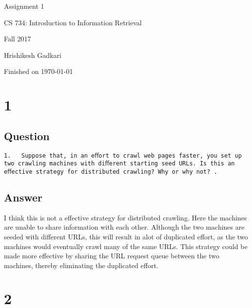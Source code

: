 \documentclass[letterpaper,11pt]{article}
\begin{document}
\begin{titlepage}

\begin{center}

\Huge{Assignment 1}

\Large{CS 734:  Introduction to Information Retrieval}

\Large{Fall 2017}

\Large{Hrishikesh Gadkari}

\Large Finished on \today

\end{center}

\end{titlepage}

\newpage


\section*{1}

\subsection*{Question}

\begin{verbatim}
1.   Suppose that, in an eﬀort to crawl web pages faster, you set up two crawling machines with diﬀerent starting seed URLs. Is this an eﬀective strategy for distributed crawling? Why or why not? .
\end{verbatim}

\clearpage
\subsection*{Answer}

I think this is not a effective strategy for distributed crawling. Here the  machines are unable to share information with each other. Although the two machines are seeded with different URLs, this will result in alot of duplicated effort, as the two machines would eventually crawl many of the same URLs. This strategy could be made more effective by sharing the URL request queue between the two machines, thereby eliminating the duplicated effort.

\clearpage


\section*{2}
\end{document}
